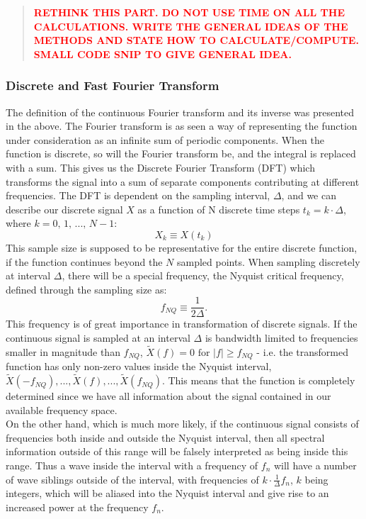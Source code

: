 \documentclass[../../CompleteThesis/Complete_1stDraft]{subfiles}
\begin{document}
\begin{quote}
	\textcolor{red}{\textbf{RETHINK THIS PART. DO NOT USE TIME ON ALL THE CALCULATIONS. WRITE THE GENERAL IDEAS OF THE METHODS AND STATE HOW TO CALCULATE/COMPUTE. SMALL CODE SNIP TO GIVE GENERAL IDEA.}}
\end{quote}

\subsubsection[DFT \& FFT][DFT \& FFT]{Discrete and Fast Fourier Transform}
The definition of the continuous Fourier transform and its inverse was presented in the above. The Fourier transform is as seen a way of representing the function under consideration as an infinite sum of periodic components. When the function is discrete, so will the Fourier transform be, and the integral is replaced with a sum. This gives us the Discrete Fourier Transform (DFT) which transforms the signal into a sum of separate components contributing at different frequencies. The DFT is dependent on the sampling interval, $\Delta$, and we can describe our discrete signal $X$ as a function of N discrete time steps $t_k = k\cdot\Delta$, where $k = 0, \, 1,\, ..., \, N-1$:
\begin{equation}
	X_k \equiv X(t_k)
	\label{Eq:DiscreteSignal}
\end{equation}
This sample size is supposed to be representative for the entire discrete function, if the function continues beyond the $N$ sampled points. When sampling discretely at interval $\Delta$, there will be a special frequency, the Nyquist critical frequency, defined through the sampling size as:
\begin{equation}
	f_{NQ} \equiv \frac{1}{2\Delta}.
	\label{Eq:NyquistFreq}
\end{equation}
This frequency is of great importance in transformation of discrete signals. If the continuous signal is sampled at an interval $\Delta$ is bandwidth limited to frequencies smaller in magnitude than $f_{NQ}$, $\tilde{X}(f) = 0 \text{ for } |f| \geq f_{NQ}$ - i.e. the transformed function has only non-zero values inside the Nyquist interval, $\tilde{X}(-f_{NQ}), ..., \tilde{X}(f), ..., \tilde{X}(f_{NQ})$. This means that the function is completely determined since we have all information about the signal contained in our available frequency space.\\
On the other hand, which is much more likely, if the continuous signal consists of frequencies both inside and outside the Nyquist interval, then all spectral information outside of this range will be falsely interpreted as being inside this range. Thus a wave inside the interval with a frequency of $f_n$ will have a number of wave siblings outside of the interval, with frequencies  of $k\cdot \frac{1}{\Delta} f_n$, $k$ being integers, which will be aliased into the Nyquist interval and give rise to an increased power at the frequency $f_n$.\\
\end{document}
